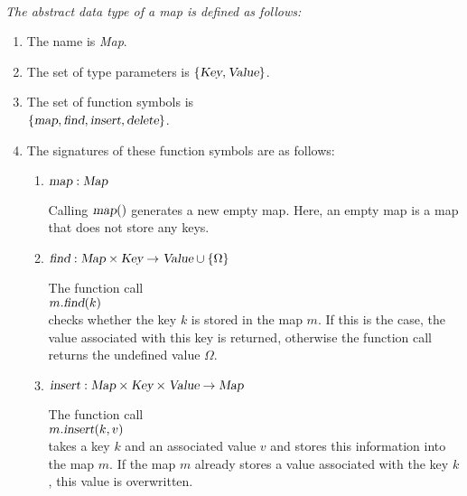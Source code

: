\begin{Definition}[Map] \hspace*{\fill} \\
{\em
  The abstract data type of a \emph{map} is defined as follows:
  \begin{enumerate}
  \item The name is \textsl{Map}.
  \item The set of type parameters is $\{ \textsl{Key}, \textsl{Value} \}$.
  \item The set of function symbols is \\[0.1cm]
       \hspace*{1.3cm} 
       $\{ \textsl{map}, \textsl{find}, \textsl{insert}, \textsl{delete} \}$.
  \item The signatures of these function symbols are as follows:
        \begin{enumerate}
        \item $\textsl{map}: \textsl{Map}$

              Calling $\textsl{map}()$ generates a new empty map.  Here, an empty map is a map that
              does not store any keys.
        \item $\textsl{find}: \textsl{Map} \times \textsl{Key} \rightarrow \textsl{Value} \cup \{\Omega\}$

              The function call
              \\[0.2cm]
              \hspace*{1.3cm}
              $m.\textsl{find}(k)$ 
              \\[0.2cm]
              checks whether the key $k$ is stored in the map $m$.  If this is the case, the
              value associated with this key is returned, otherwise the function call returns
              the undefined value $\Omega$.
        \item $\textsl{insert}: \textsl{Map} \times \textsl{Key} \times \textsl{Value} \rightarrow \textsl{Map}$

              The function call
              \\[0.2cm]
              \hspace*{1.3cm}
              $m.\textsl{insert}(k,v)$ 
              \\[0.2cm]
              takes a key $k$ and an associated value $v$ and stores this information into the map
              $m$.  If the map $m$ already stores a value associated with the key $k$, this value
              is overwritten.  


\end{enumerate}
\end{enumerate}}
\end{Definition}

